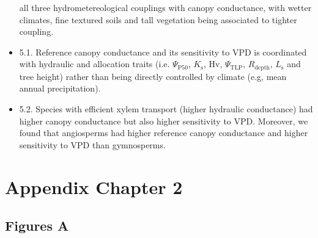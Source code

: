\documentclass[11pt,twoside]{reedthesis}
\begin{document}
\begin{itemize}
  all three hydrometereological couplings with canopy conductance, with
  wetter climates, fine textured soils and tall vegetation being
  associated to tighter coupling.\par
\item
  5.1. Reference canopy conductance and its sensitivity to VPD is
  coordinated with hydraulic and allocation traits (i.e.
  \(\Psi_{\text{P50}}\), \(K_{\text{s}}\), Hv, \(\Psi_{\text{TLP}}\),
  \(R_{\text{depth}}\), \(L_{\text{s}}\) and tree height) rather than
  being directly controlled by climate (e.g, mean annual
  precipitation).\par
\item
  5.2. Species with efficient xylem transport (higher hydraulic
  conductance) had higher canopy conductance but also higher sensitivity
  to VPD. Moreover, we found that angiosperms had higher reference
  canopy conductance and higher sensitivity to VPD than gymnosperms.\par
\end{itemize}
\newpage

\null\newpage

\appendix

\chapter{Appendix Chapter 2}\label{appendix-chapter-2}

\newpage

\section{Figures A}\label{figures-a}

\setlength{\abovecaptionskip}{0pt}
\end{document}
